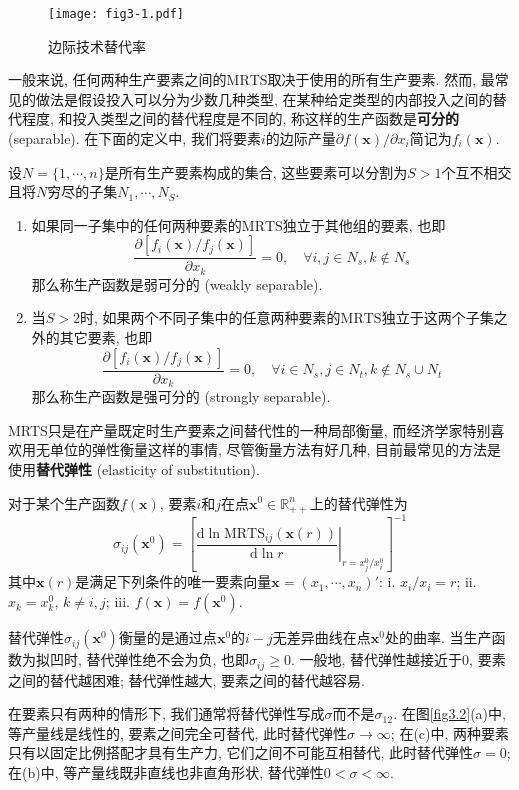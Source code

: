 \documentclass[cn, 12pt, math=mtpro2, bibstyle=apa, blue]{elegantbook}
\newcommand{\R}{\mathbb{R}}
\newcommand{\x}{\mathbf{x}}
\begin{document}
\begin{figure}[htbp!]
  \centering
  \texttt{[image: fig3-1.pdf]}
  \caption{边际技术替代率}\label{fig3.1}
\end{figure}

一般来说, 任何两种生产要素之间的$\text{MRTS}$取决于使用的所有生产要素. 然而, 最常见的做法是假设投入可以分为少数几种类型, 在某种给定类型的内部投入之间的替代程度, 和投入类型之间的替代程度是不同的, 称这样的生产函数是\textbf{可分的} (separable). 在下面的定义中, 我们将要素$i$的边际产量$\partial f(\x)/\partial x_i$简记为$f_i(\x)$.

\begin{definition}[可分性]
设$N=\{1,\cdots,n\}$是所有生产要素构成的集合, 这些要素可以分割为$S>1$个互不相交且将$N$穷尽的子集$N_1,\cdots,N_S$. 
\begin{enumerate}[label=\arabic*.]
\item 如果同一子集中的任何两种要素的$\text{MRTS}$独立于其他组的要素, 也即
$$\frac{\partial [f_i(\x)/f_j(\x)]}{\partial x_k}=0,\quad \forall i,j\in N_s, k\notin N_s$$
那么称生产函数是弱可分的 (weakly separable).
\item 当$S>2$时, 如果两个不同子集中的任意两种要素的$\text{MRTS}$独立于这两个子集之外的其它要素, 也即
$$\frac{\partial [f_i(\x)/f_j(\x)]}{\partial x_k}=0,\quad \forall i\in N_s, j\in N_t, k\notin N_s\cup N_t$$
那么称生产函数是强可分的 (strongly separable).
\end{enumerate}
\end{definition}
MRTS只是在产量既定时生产要素之间替代性的一种局部衡量, 而经济学家特别喜欢用无单位的弹性衡量这样的事情, 尽管衡量方法有好几种, 目前最常见的方法是使用\textbf{替代弹性} (elasticity of substitution).

\begin{definition}[替代弹性]
 对于某个生产函数$f(\x)$, 要素$i$和$j$在点$\x^0\in\R_{++}^n$上的替代弹性为
 $$\sigma_{ij}(\x^0)=\left[\left.\frac{\text{d}\ln\text{MRTS}_{ij}(\x(r))}{\text{d}\ln r}\right|_{r=x_j^0/x_i^0}\right]^{-1}$$
 其中$\x(r)$是满足下列条件的唯一要素向量$\x=(x_1,\cdots,x_n)'$: i. $x_i/x_i=r$; ii. $x_k=x_k^0$, $k\neq i,j$; iii. $f(\x)=f(\x^0)$.
\end{definition}
替代弹性$\sigma_{ij}(\x^0)$衡量的是通过点$\x^0$的$i-j$无差异曲线在点$\x^0$处的曲率. 当生产函数为拟凹时, 替代弹性绝不会为负, 也即$\sigma_{ij}\ge0$. 一般地, 替代弹性越接近于0, 要素之间的替代越困难; 替代弹性越大, 要素之间的替代越容易.

在要素只有两种的情形下, 我们通常将替代弹性写成$\sigma$而不是$\sigma_{12}$. 在图\ref{fig3.2}(a)中, 等产量线是线性的, 要素之间完全可替代, 此时替代弹性$\sigma\to\infty$; 在(c)中, 两种要素只有以固定比例搭配才具有生产力, 它们之间不可能互相替代, 此时替代弹性$\sigma=0$; 在(b)中, 等产量线既非直线也非直角形状, 替代弹性$0<\sigma<\infty$.
\end{document}
